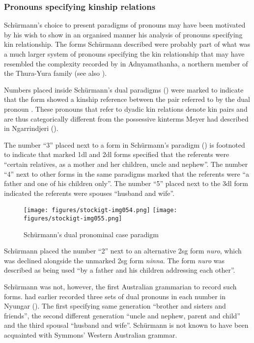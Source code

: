 \subsubsection{Pronouns specifying kinship relations}
\label{sec:key:6.2.1.4}\label{bkm:Ref456255508}

Schürmann’s choice to present paradigms of pronouns may have been motivated by his wish to show in an organised manner his analysis of pronouns specifying kin relationship. The forms Schürmann described were probably part of what was a much larger system of pronouns specifying the kin relationship that may have resembled the complexity recorded by \citet{schebeck_adnjamathanha_1973} in Adnyamathanha, a northern member of the Thura-Yura family (see also \citealt{hercus_perception_1973}).

Numbers placed inside Schürmann’s dual paradigms () were marked to indicate that the form showed a kinship reference between the pair referred to by the dual pronoun \citep[11--13]{schurmann_vocabulary_1844}. These pronouns that refer to dyadic kin relations \citep{evans_interesting_2003} denote kin pairs and are thus categorically different from the possessive kinterms Meyer had described in Ngarrindjeri ().

The number ``3'' placed next to a form in Schürmann’s paradigm () is footnoted to indicate that marked 1dl and 2dl forms specified that the referents were “certain relatives, as a mother and her children, uncle and nephew”. The number ``4'' next to other forms in the same paradigms marked that the referents were “a father and one of his children only”. The number ``5'' placed next to the 3dl form indicated the referents were spouses “husband and wife”.


\begin{figure}[t]
\texttt{[image: figures/stockigt-img054.png]}
\texttt{[image: figures/stockigt-img055.png]}
\caption{Schürmann’s dual pronominal case paradigm \citeyearpar[11–12]{schurmann_vocabulary_1844}}
\label{fig:key:110}
\end{figure}

Schürmann placed the number “2” next to an alternative 2sg form \textit{nuro}, which was declined alongside the unmarked 2sg form \textit{ninna}. The form \textit{nuro} was described as being used “by a father and his children addressing each other”.

Schürmann was not, however, the first Australian grammarian to record such forms. \citet[xiv–xv]{symmons_grammatical_1841} had earlier recorded three sets of dual pronouns in each number in Nyungar (). The first specifying same generation ``brother and sisters and friends'', the second different generation ``uncle and nephew, parent and child'' and the third spousal ``husband and wife''. Schürmann is not known to have been acquainted with Symmons' Western Australian grammar.


